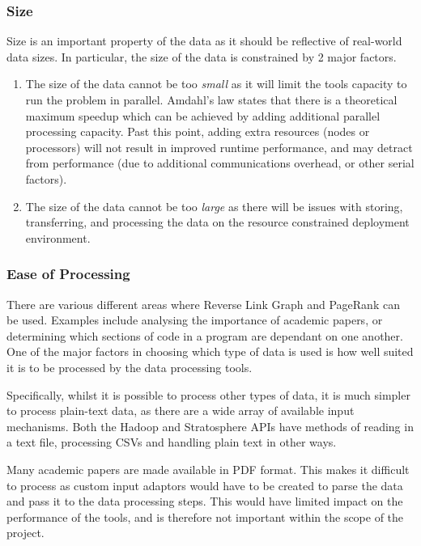 \subsubsection{Size}
Size is an important property of the data as it should be reflective of real-world data sizes. In particular, the size of the data is constrained by 2 major factors.

\begin{enumerate}
	\item The size of the data cannot be too \textit{small} as it will limit the tools capacity to run the problem in parallel. Amdahl's law \cite{amdahl1967validity} states that there is a theoretical maximum speedup which can be achieved by adding additional parallel processing capacity. Past this point, adding extra resources (nodes or processors) will not result in improved runtime performance, and may detract from performance (due to additional communications overhead, or other serial factors).
	\item The size of the data cannot be too \textit{large} as there will be issues with storing, transferring, and processing the data on the resource constrained deployment environment.
\end{enumerate}

\subsubsection{Ease of Processing}
There are various different areas where Reverse Link Graph and PageRank can be used. Examples include analysing the importance of academic papers, or determining which sections of code in a program are dependant on one another. One of the major factors in choosing which type of data is used is how well suited it is to be processed by the data processing tools. 

Specifically, whilst it is possible to process other types of data, it is much simpler to process plain-text data, as there are a wide array of available input mechanisms. Both the Hadoop and Stratosphere APIs have methods of reading in a text file, processing CSVs and handling plain text in other ways. 

Many academic papers are made available in PDF format. This makes it difficult to process as custom input adaptors would have to be created to parse the data and pass it to the data processing steps. This would have limited impact on the performance of the tools, and is therefore not important within the scope of the project. 

